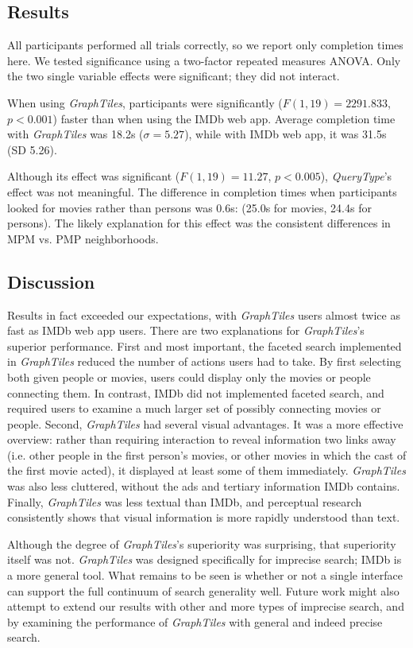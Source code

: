 \subsection{Results}

All participants performed all trials correctly, so we report only completion times here. We tested significance using a two-factor repeated measures ANOVA. Only the two single variable effects were significant; they did not interact. 

When using \textit{GraphTiles}, participants were significantly ($F(1,19)=2291.833$, $p<0.001$) faster than when using the IMDb web app. Average completion time with \textit{GraphTiles} was 18.2s ($\sigma =5.27$), while with IMDb web app, it was 31.5s (SD 5.26).

Although its effect was significant ($F(1,19)=11.27$, $p<0.005$), \textit{QueryType}'s effect was not meaningful. The difference in completion times when participants looked for movies rather than persons was 0.6s: (25.0s for movies, 24.4s for persons). The likely explanation for this effect was the consistent differences in MPM vs. PMP neighborhoods.


\subsection{Discussion}

Results in fact exceeded our expectations, with \textit{GraphTiles} users almost twice as fast as IMDb web app users. There are two explanations for \textit{GraphTiles}'s superior performance. First and most important, the faceted search implemented in \textit{GraphTiles} reduced the number of actions users had to take. By first selecting both given people or movies, users could display only the movies or people connecting them. In contrast, IMDb did not implemented faceted search, and required users to examine a much larger set of possibly connecting movies or people. Second, \textit{GraphTiles} had several visual advantages. It was a more effective overview: rather than requiring interaction to reveal information two links away (i.e. other people in the first person's movies, or other movies in which the cast of the first movie acted), it displayed at least some of them immediately. \textit{GraphTiles} was also less cluttered, without the ads and tertiary information IMDb contains. Finally, \textit{GraphTiles} was less textual than IMDb, and perceptual research consistently shows that visual information is more rapidly understood than text.

Although the degree of \textit{GraphTiles}'s superiority was surprising, that superiority itself was not. \textit{GraphTiles} was designed specifically for imprecise search; IMDb is a more general tool. What remains to be seen is whether or not a single interface can support the full continuum of search generality well. Future work might also attempt to extend our results with other and more types of imprecise search, and by examining the performance of \textit{GraphTiles} with general and indeed precise search.
